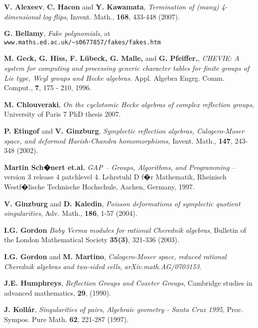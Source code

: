 \documentclass[a4apper,10pt]{amsart}
\theoremstyle{definition}
\numberwithin{thm}{section}
\begin{document}
\begin{thebibliography}{100}

\textbf{V. Alexeev}, \textbf{C. Hacon} and \textbf{Y. Kawamata}, \textit{Termination of (many) 4-dimensional log flips}, Invent. Math., \textbf{168}, 433-448 (2007).

\textbf{G. Bellamy}, \textit{Fake polynomials}, at \verb+www.maths.ed.ac.uk/~s0677857/fakes/fakes.htm+

\textbf{M. Geck, G. Hiss, F. L{\"u}beck, G. Malle,} and \textbf{G. Pfeiffer.}, \textit{CHEVIE: A system for computing and processing generic character tables for finite groups of Lie type, Weyl groups and Hecke algebras.} Appl. Algebra Engrg. Comm. Comput., \textbf{7}, 175 - 210, 1996.

\textbf{M. Chlouveraki}, \textit{On the cyclotomic Hecke algebras of complex reflection groups}, University of Paris 7 PhD thesis 2007.


\textbf{P. Etingof} and \textbf{V. Ginzburg}, \textit{Symplectic reflection algebras, Calogero-Moser space, and deformed Harish-Chandra homomorphisms}, Invent. Math., \textbf{147}, 243-348 (2002).


\textbf{Martin Sch�nert et.al.} \textit{GAP -- Groups, Algorithms, and Programming} -- version 3 release 4 patchlevel 4. Lehrstuhl D f�r Mathematik, Rheinisch Westf�lische Technische Hochschule, Aachen, Germany, 1997. 



\textbf{V. Ginzburg} and \textbf{D. Kaledin}, \textit{Poisson deformations of symplectic quotient singularities}, Adv. Math., \textbf{186}, 1-57 (2004).


\textbf{I.G. Gordon} \textit{Baby Verma modules for rational Cherednik algebras}, Bulletin of the London Mathematical Society \textbf{35(3)}, 321-336 (2003).

\textbf{I.G. Gordon} and \textbf{M. Martino}, \textit{Calogero-Moser space, reduced rational Cherednik algebras and two-sided cells}, \textit{arXiv.math.AG/0703153}.

\textbf{J.E. Humphreys}, \textit{Reflection Groups and Coxeter Groups}, Cambridge studies in advanced mathematics, \textbf{29}, (1990). 


\textbf{J. Koll{\'a}r}, \textit{Singularities of pairs}, \textit{Algebraic geometry - Santa Cruz 1995}, Proc. Sympos. Pure Math. \textbf{62}, 221-287 (1997).



\end{thebibliography}
\end{document}
